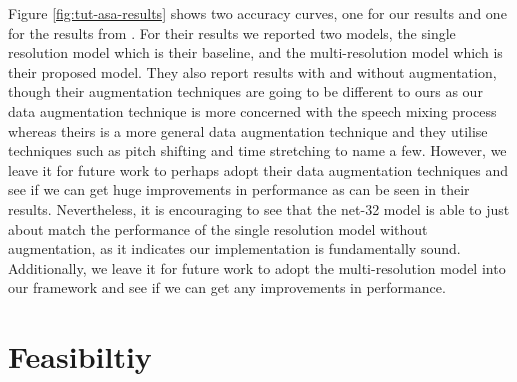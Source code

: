 \documentclass[logo,bsc,singlespacing,parskip,online]{infthesis}
\begin{document}
Figure \ref{fig:tut-asa-results} shows two accuracy curves, one for our results 
and one for the results from \citet{schindler_multi-temporal_2018}. For their results 
we reported two models, the single resolution model which is their baseline, 
and the multi-resolution model which is their proposed model. They also 
report results with and without augmentation, though their augmentation techniques 
are going to be different to ours as our data augmentation technique is more 
concerned with the speech mixing process whereas theirs is a more general 
data augmentation technique and they utilise techniques such as pitch shifting and 
time stretching to name a few. However, we leave it for future work 
to perhaps adopt their data augmentation techniques and see 
if we can get huge improvements in performance as can be seen in their results.
Nevertheless, it is encouraging to see 
that the net-32 model is able to just about match the performance of the single resolution model 
without augmentation, as it indicates our implementation is fundamentally sound. Additionally, we 
leave it for future work to adopt the multi-resolution model into our framework and see 
if we can get any improvements in performance.

\section{Feasibiltiy} 
\end{document}
